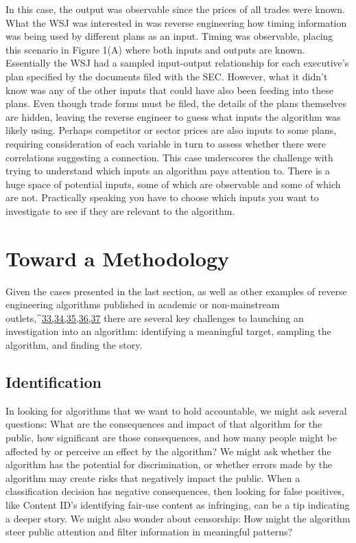 In this case, the output was observable since the prices of all trades were known. What the WSJ was interested in was reverse engineering how timing information was being used by different plans as an input. Timing was observable, placing this scenario in Figure 1(A) where both inputs and outputs are known. Essentially the WSJ had a sampled input-output relationship for each executive's plan specified by the documents filed with the SEC. However, what it didn't know was any of the other inputs that could have also been feeding into these plans. Even though trade forms must be filed, the details of the plans themselves are hidden, leaving the reverse engineer to guess what inputs the algorithm was likely using. Perhaps competitor or sector prices are also inputs to some plans, requiring consideration of each variable in turn to assess whether there were correlations suggesting a connection. This case underscores the challenge with trying to understand which inputs an algorithm pays attention to. There is a huge space of potential inputs, some of which are observable and some of which are not. Practically speaking you have to choose which inputs you want to investigate to see if they are relevant to the algorithm. 

\chapter{Toward a Methodology }
Given the cases presented in the last section, as well as other examples of reverse engineering algorithms published in academic or non-mainstream outlets,^{\href{#endnotes}{33,34,35,36,37}} there are several key challenges to launching an investigation into an algorithm: identifying a meaningful target, sampling the algorithm, and finding the story.

\section{Identification}
In looking for algorithms that we want to hold accountable, we might ask several questions: What are the consequences and impact of that algorithm for the public, how significant are those consequences, and how many people might be affected by or perceive an effect by the algorithm? We might ask whether the algorithm has the potential for discrimination, or whether errors made by the algorithm may create risks that negatively impact the public. When a classification decision has negative consequences, then looking for false positives, like Content ID's identifying fair-use content as infringing, can be a tip indicating a deeper story. We might also wonder about censorship: How might the algorithm steer public attention and filter information in meaningful patterns? 

